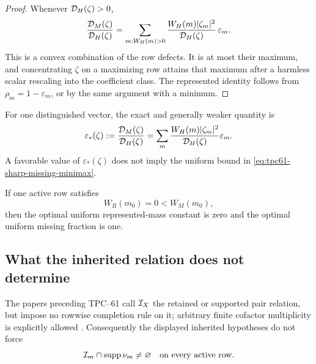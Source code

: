 \begin{proof}
Whenever \(\mathcal D_H(\zeta)>0\),
\begin{equation}
 \frac{\mathcal D_M(\zeta)}{\mathcal D_H(\zeta)}
 =\sum_{m:W_H(m)>0}
   \frac{W_H(m)|\zeta_m|^2}{\mathcal D_H(\zeta)}\,
   \varepsilon_m.
 \label{eq:tpc61-defect-convex-combination}
\end{equation}
This is a convex combination of the row defects.  It is at most their
maximum, and concentrating \(\zeta\) on a maximizing row attains that
maximum after a harmless scalar rescaling into the coefficient class.
The represented identity follows from \(\rho_m=1-\varepsilon_m\), or by
the same argument with a minimum.
\end{proof}

For one distinguished vector, the exact and generally weaker quantity is
\begin{equation}
 \varepsilon_*(\zeta)
 :=\frac{\mathcal D_M(\zeta)}{\mathcal D_H(\zeta)}
 =\sum_m
   \frac{W_H(m)|\zeta_m|^2}{\mathcal D_H(\zeta)}\varepsilon_m.
 \label{eq:tpc61-distinguished-defect}
\end{equation}
A favorable value of \(\varepsilon_*(\zeta)\) does not imply the uniform
bound in \eqref{eq:tpc61-sharp-missing-minimax}.

\begin{corollary}
\label{cor:tpc61-missing-only-row-kill}
If one active row satisfies
\begin{equation}
 W_R(m_0)=0<W_M(m_0),
 \label{eq:tpc61-missing-only-row}
\end{equation}
then the optimal uniform represented-mass constant is zero and the optimal
uniform missing fraction is one.
\end{corollary}

\subsection{What the inherited relation does not determine}

The papers preceding TPC--61 call \(\mathcal I_X\) the retained or supported
pair relation, but impose no rowwise completion rule on it; arbitrary
finite cofactor multiplicity is explicitly allowed
\citep{WangTPC53,WangTPC54}.  Consequently the displayed inherited
hypotheses do not force
\begin{equation}
 \mathcal I_m\cap\operatorname{supp}\nu_m\ne\varnothing
 \quad\text{on every active row}.
 \label{eq:tpc61-unproved-row-intersection}
\end{equation}


